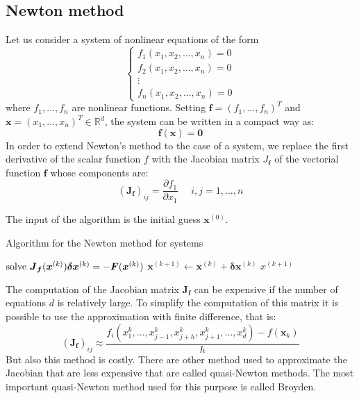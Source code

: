 \documentclass[12pt, a4paper]{report}
\begin{document}
    \subsection{Newton method}
    Let us consider a system of nonlinear equations of the form
    \[\begin{cases}
        f_1(x_1,x_2,\dots,x_n)=0 \\
        f_2(x_1,x_2,\dots,x_n)=0 \\
        \vdots                   \\
        f_n(x_1,x_2,\dots,x_n)=0 
    \end{cases}\]
    where $f_1,\dots,f_n$ are nonlinear functions. Setting $\boldsymbol{f}=(f_1,\dots,f_n)^T$ and $\boldsymbol{x}=(x_1,\dots,x_n)^T \in \mathbb{R}^d$, the system can be written in a compact way as: 
    \[\boldsymbol{f}(\boldsymbol{x})=\boldsymbol{0}\]
    In order to extend Newton's method to the case of a system, we replace the first derivative of the scalar function $f$ with the Jacobian matrix $J_{\boldsymbol{f}}$ of the vectorial 
    function $\boldsymbol{f}$ whose components are: 
    \[(\boldsymbol{J}_{\boldsymbol{f}})_{ij}=\dfrac{\partial f_1}{\partial x_1} \:\:\:\:\:\: i,j=1,\dots,n\]

    The input of the algorithm is the initial guess $\boldsymbol{x}^{(0)}$. 
    \begin{algorithm}[H]
        \caption{Algorithm for the Newton method for systems}
            \begin{algorithmic}[1]
                    \State $\textnormal{solve  } \boldsymbol{J}_{\boldsymbol{f}}(\boldsymbol{x}^{(k)})\boldsymbol{\delta}\boldsymbol{x}^{(k)}=-\boldsymbol{F}(\boldsymbol{x}^{(k)})$
                    \State $\boldsymbol{x}^{(k+1)} \leftarrow \boldsymbol{x}^{(k)}+\boldsymbol{\delta}\boldsymbol{x}^{(k)}$
                        \State \Return $x^{(k+1)}$
                    \EndIf
                \EndFor
            \end{algorithmic}
    \end{algorithm}
    The computation of the Jacobian matrix $\boldsymbol{J}_{\boldsymbol{f}}$ can be expensive if the number of equations $d$ is relatively large. To simplify the computation of this matrix
    it is possible to use the approximation with finite difference, that is: 
    \[(\boldsymbol{J}_{\boldsymbol{f}})_{ij} \approx \dfrac{f_i(x_1^{k},\dots,x_{j-1}^{k},x_{j+h}^{k},x_{j+1}^{k},\dots,x_{d}^{k})-f(\boldsymbol{x}_{k})}{h}\]
    But also this method is costly. There are other method used to approximate the Jacobian that are less expensive that are called quasi-Newton methods. The most important 
    quasi-Newton method used for this purpose is called Broyden. 
\end{document}

